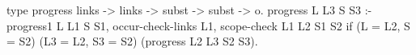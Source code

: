   type progress links -> links -> subst -> subst -> o.
  progress L L3 S S3 :-
    progress1 L L1 S S1,
    occur-check-links L1,
    scope-check L1 L2 S1 S2
    if (L = L2, S = S2) (L3 = L2, S3 = S2)
       (progress L2 L3 S2 S3).
